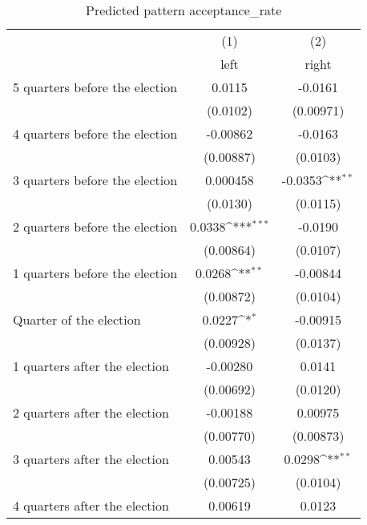 \begin{table}[htbp]\centering
\def\sym#1{\ifmmode^{#1}\else\(^{#1}\)\fi}
\caption{Predicted pattern acceptance\_rate}
\begin{tabular}{l*{2}{c}}
\hline\hline
                    &\multicolumn{1}{c}{(1)}&\multicolumn{1}{c}{(2)}\\
                    &\multicolumn{1}{c}{left}&\multicolumn{1}{c}{right}\\
\hline
 5 quarters before the election&      0.0115         &     -0.0161         \\
                    &    (0.0102)         &   (0.00971)         \\
[1em]
 4 quarters before the election&    -0.00862         &     -0.0163         \\
                    &   (0.00887)         &    (0.0103)         \\
[1em]
 3 quarters before the election&    0.000458         &     -0.0353\sym{**} \\
                    &    (0.0130)         &    (0.0115)         \\
[1em]
 2 quarters before the election&      0.0338\sym{***}&     -0.0190         \\
                    &   (0.00864)         &    (0.0107)         \\
[1em]
 1 quarters before the election&      0.0268\sym{**} &    -0.00844         \\
                    &   (0.00872)         &    (0.0104)         \\
[1em]
Quarter of the election&      0.0227\sym{*}  &    -0.00915         \\
                    &   (0.00928)         &    (0.0137)         \\
[1em]
 1 quarters after the election&    -0.00280         &      0.0141         \\
                    &   (0.00692)         &    (0.0120)         \\
[1em]
 2 quarters after the election&    -0.00188         &     0.00975         \\
                    &   (0.00770)         &   (0.00873)         \\
[1em]
 3 quarters after the election&     0.00543         &      0.0298\sym{**} \\
                    &   (0.00725)         &    (0.0104)         \\
[1em]
 4 quarters after the election&     0.00619         &      0.0123         \\

\end{tabular}
\end{table}

